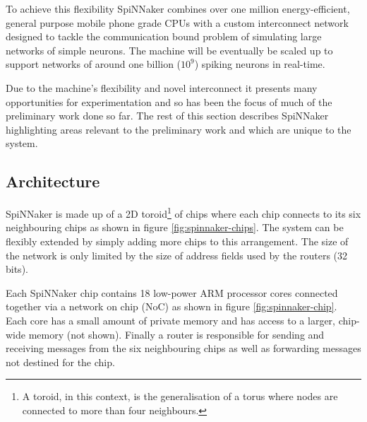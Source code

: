 		To achieve this flexibility SpiNNaker combines over one million
		energy-efficient, general purpose mobile phone grade CPUs with a custom
		interconnect network designed to tackle the communication bound problem of
		simulating large networks of simple neurons. The machine will be eventually
		be scaled up to support networks of around one billion ($10^9$) spiking
		neurons in real-time.
		
		Due to the machine's flexibility and novel interconnect it presents many
		opportunities for experimentation and so has been the focus of much of the
		preliminary work done so far. The rest of this section describes SpiNNaker
		highlighting areas relevant to the preliminary work and which are unique to
		the system.
		
		\subsection{Architecture}
			
			
			SpiNNaker is made up of a 2D toroid\footnote{A toroid, in this context, is
			the generalisation of a torus where nodes are connected to more than four
			neighbours.} of chips where each chip connects to its six neighbouring
			chips as shown in figure \ref{fig:spinnaker-chips}. The system can be
			flexibly extended by simply adding more chips to this arrangement. The
			size of the network is only limited by the size of address fields used by
			the routers (32 bits).
			
			Each SpiNNaker chip contains 18 low-power ARM processor cores connected
			together via a network on chip (NoC) as shown in figure
			\ref{fig:spinnaker-chip}. Each core has a small amount of private memory
			and has access to a larger, chip-wide memory (not shown). Finally a router
			is responsible for sending and receiving messages from the six
			neighbouring chips as well as forwarding messages not destined for the
			chip.
			
			
